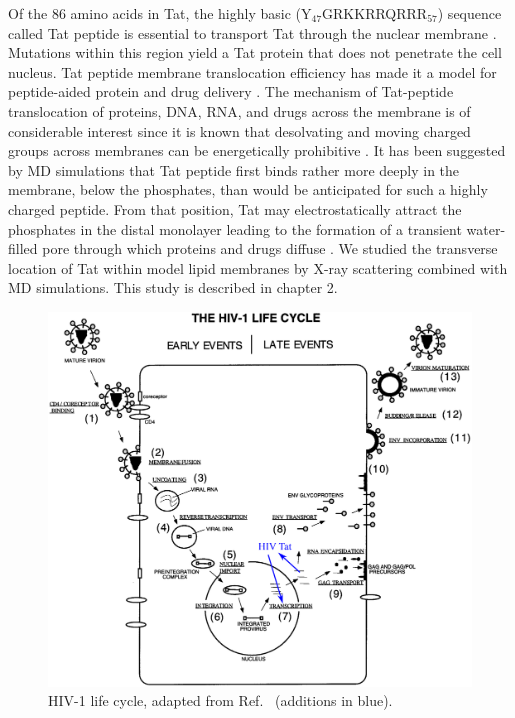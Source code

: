 Of the 86 amino acids in Tat,
the highly basic (Y$_{47}$GRKKRRQRRR$_{57}$) sequence called Tat peptide 
is essential to transport
Tat through the nuclear membrane \cite{Ruben89,Hauber87}. 
Mutations within
this region yield a Tat protein that does not penetrate the cell 
nucleus. Tat peptide membrane translocation efficiency 
has made it a model for peptide-aided protein and drug delivery
\cite{Futaki01}. 
The mechanism of Tat-peptide translocation of proteins, 
DNA, RNA, and drugs across the membrane is of considerable interest
since it is known that desolvating and moving charged groups across membranes
can be energetically prohibitive \cite{Grabe04}. 
It has been suggested by MD simulations that Tat peptide first binds rather
more deeply in the membrane, below the phosphates, than
would be anticipated for such a highly charged peptide. From that position,
Tat may electrostatically attract the phosphates in the distal monolayer
leading to the formation of a transient water-filled pore through which
proteins and drugs diffuse \cite{Herce07}. 
We studied the transverse location of Tat within model lipid membranes 
by X-ray scattering
combined with MD simulations. This study is described in chapter 2.

\begin{figure}[htbp]
  \centering
  \includegraphics[width=\textwidth]{figures/HIV_lifecycle}
  \caption[HIV-1 life cycle, adapted from Ref.~\cite{Freed98}]
  {HIV-1 life cycle, adapted from Ref.~\cite{Freed98}
  (additions in blue).}
  \label{fig:HIV_lifecycle}
\end{figure}

